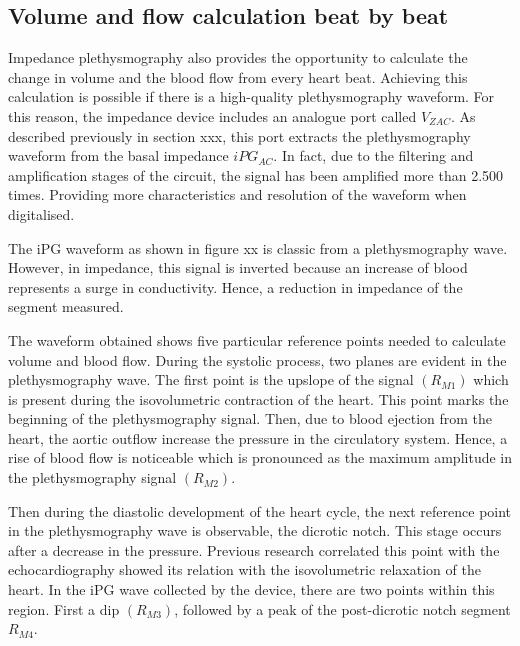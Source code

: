 \subsection{Volume and flow calculation beat by beat}
\label{section4.3.2}
Impedance plethysmography also provides the opportunity to calculate the change in volume and the blood flow from every heart beat. Achieving this calculation is possible if there is a high-quality plethysmography waveform. For this reason, the impedance device includes an analogue port called $V_{ZAC}$. As described previously in section xxx, this port extracts the plethysmography waveform from the basal impedance $iPG_{AC}$. In fact, due to the filtering and amplification stages of the circuit, the signal has been amplified more than 2.500 times. Providing more characteristics and resolution of the waveform when digitalised.


The iPG waveform as shown in figure xx is classic from a plethysmography wave. However, in impedance, this signal is inverted because an increase of blood represents a surge in conductivity. Hence, a reduction in impedance of the segment measured.  


The waveform obtained shows five particular reference points needed to calculate volume and blood flow. During the systolic process, two planes are evident in the plethysmography wave. The first point is the upslope of the signal $(R_{M1})$ which is present during the isovolumetric contraction of the heart.  This point marks the beginning of the plethysmography signal. Then, due to blood ejection from the heart, the aortic outflow increase the pressure in the circulatory system. Hence, a rise of blood flow is noticeable which is pronounced as the maximum amplitude in the plethysmography signal $(R_{M2})$. 

Then during the diastolic development of the heart cycle, the next reference point in the plethysmography wave is observable, the dicrotic notch. This stage occurs after a decrease in the pressure. Previous research correlated this point with the echocardiography showed its relation with the isovolumetric relaxation of the heart. In the iPG wave collected by the device, there are two points within this region. First a dip $(R_{M3})$, followed by a peak of the post-dicrotic notch segment $R_{M4}$. 


